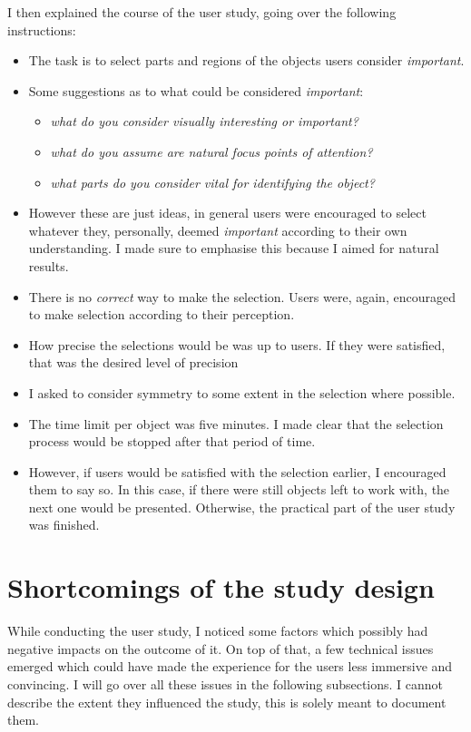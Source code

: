 I then explained the course of the user study, going over the following instructions:
\begin{itemize}
	\item The task is to select parts and regions of the objects users consider \textit{important}.
	\item Some suggestions as to what could be considered \textit{important}:
		\begin{itemize}
			\item \textit{what do you consider visually interesting or important?}
			\item \textit{what do you assume are natural focus points of attention?}
			\item \textit{what parts do you consider vital for identifying the object?}
		\end{itemize}
	\item However these are just ideas, in general users were encouraged to select whatever they, personally, deemed \textit{important} according to their own understanding. I made sure to emphasise this because I aimed for natural results.
	\item There is no \textit{correct} way to make the selection. Users were, again, encouraged to make selection according to their perception.
	\item How precise the selections would be was up to users. If they were satisfied, that was the desired level of precision
	\item I asked to consider symmetry to some extent in the selection where possible.
	\item The time limit per object was five minutes. I made clear that the selection process would be stopped after that period of time.
	\item However, if users would be satisfied with the selection earlier, I encouraged them to say so. In this case, if there were still objects left to work with, the next one would be presented. Otherwise, the practical part of the user study was finished.
\end{itemize}

 

\section{Shortcomings of the study design}
\label{shortcomings_of_the_study_design}
While conducting the user study, I noticed some factors which possibly had negative impacts on the outcome of it. On top of that, a few technical issues emerged which could have made the experience for the users less immersive and convincing. I will go over all these issues in the following subsections. I cannot describe the extent they influenced the study, this is solely meant to document them.

